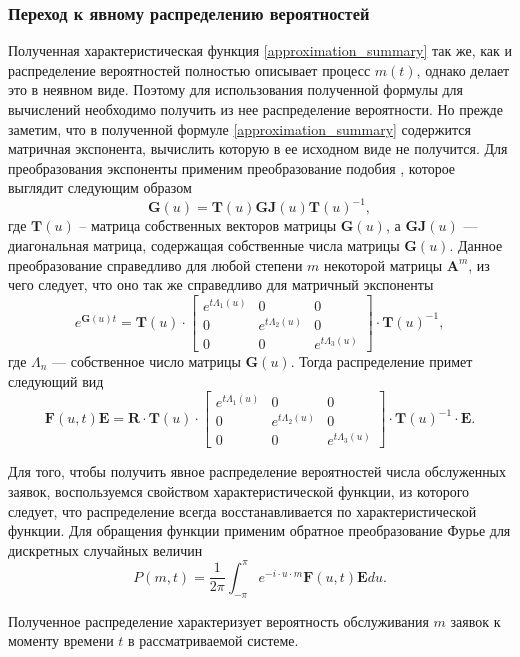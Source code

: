 \subsubsection{Переход к явному распределению вероятностей}
Полученная характеристическая функция \eqref{approximation_summary} так же, как и распределение вероятностей полностью описывает процесс $m(t)$, однако делает это в неявном виде. Поэтому для использования полученной формулы для вычислений необходимо получить из нее распределение вероятности.
Но прежде заметим, что в полученной формуле \eqref{approximation_summary} содержится матричная экспонента, вычислить которую в ее исходном виде не получится. Для преобразования экспоненты применим преобразование подобия \cite{bronson1991matrix}, которое выглядит следующим образом
\begin{equation*}
	\boldsymbol{G}(u) =\boldsymbol{T}(u)\boldsymbol{GJ}(u)\boldsymbol{T}(u)^{-1},
\end{equation*}
где $\boldsymbol{T}(u)$ – матрица собственных векторов матрицы $\boldsymbol{G}(u)$, а $\boldsymbol{GJ}(u)$ --- диагональная матрица, содержащая собственные числа матрицы $\boldsymbol{G}(u)$. Данное преобразование справедливо для любой степени $m$ некоторой матрицы $\boldsymbol{A}^{m}$, из чего следует, что оно так же справедливо для матричный экспоненты \cite{egorov2006prog}
\begin{equation*}
	e^{\boldsymbol{G}(u)t}=\boldsymbol{T}(u)\cdot \begin{bmatrix}
		e^{t \Lambda_{1}(u)} & 0 &  0\\
		0 & e^{t \Lambda_{2}(u)} & 0\\
		0 & 0 &	e^{t \Lambda_{3}(u)}
	\end{bmatrix} \cdot \boldsymbol{T}(u)^{-1},
\end{equation*}
где $\Lambda_{n}$ --- собственное число матрицы $\boldsymbol{G}(u)$. Тогда распределение примет следующий вид
\begin{equation*}
	\boldsymbol{F}(u,t)\boldsymbol{E}=\boldsymbol{R} \cdot \boldsymbol{T}(u)\cdot \begin{bmatrix}
		e^{t \Lambda_{1}(u)} & 0 &  0\\
		0 & e^{t \Lambda_{2}(u)} & 0\\
		0 & 0 &	e^{t \Lambda_{3}(u)}
	\end{bmatrix} \cdot \boldsymbol{T}(u)^{-1} \cdot \boldsymbol{E}.
\end{equation*}

Для того, чтобы получить явное распределение вероятностей числа обслуженных заявок, воспользуемся свойством характеристической функции, из которого следует, что распределение всегда восстанавливается по характеристической функции. Для обращения функции применим обратное преобразование Фурье для дискретных случайных величин
\begin{equation} \label{distr_simple_summary}
	P(m,t) = \dfrac{1}{2\pi}\int_{-\pi}^{\pi} e^{-i \cdot u \cdot m} \boldsymbol{F}(u,t)\boldsymbol{E}du.
\end{equation}

Полученное распределение характеризует вероятность обслуживания $m$ заявок к моменту времени $t$ в рассматриваемой системе.
\clearpage